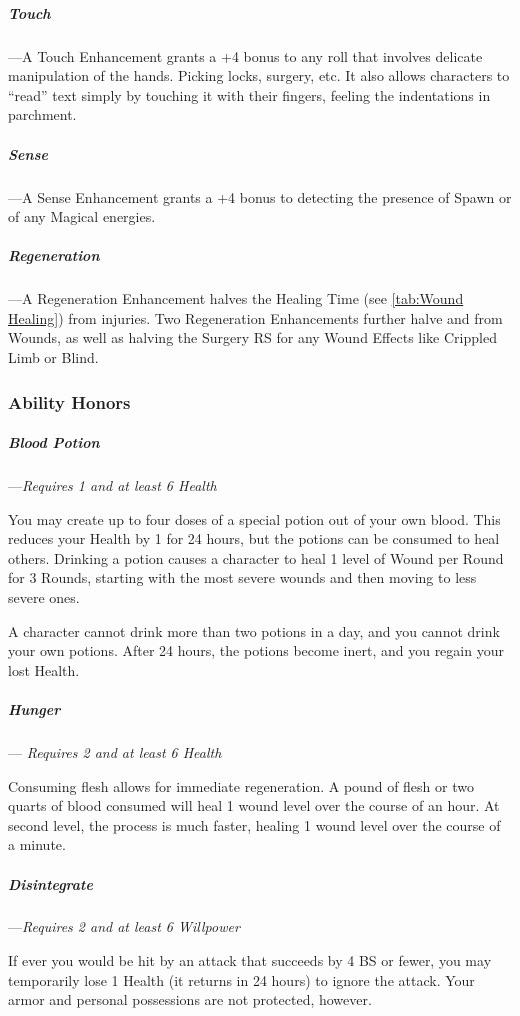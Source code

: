 \documentclass[oneside,11pt,english]{book}
\begin{document}
\subparagraph{Touch}\label{honor:Touch}
---\quad A Touch Enhancement grants a +4 bonus to any roll that involves delicate manipulation 
of the hands. Picking locks, surgery, etc. It also allows characters to “read” text simply by 
touching it with their fingers, feeling the indentations in parchment.

\subparagraph{Sense}\label{honor:Sense}
---\quad A Sense Enhancement grants a +4 bonus to detecting the presence of Spawn or of any 
Magical energies. 

\subparagraph{Regeneration}\label{honor:Regeneration}
---\quad A Regeneration Enhancement halves the Healing Time (see \autoref{tab:Wound Healing}) from injuries. Two 
Regeneration Enhancements further halve  and  from Wounds, as well as 
halving the Surgery RS for any Wound Effects like Crippled Limb or Blind.

\subsubsection{Ability Honors}
\subparagraph{Blood Potion}\label{honor:Blood Potion}
---\quad \emph{Requires  1 and at least 6 Health}

You may create up to four doses
of a special potion out of your own blood. This reduces your Health by 1 for 24 hours, but the 
potions can be consumed to heal others. Drinking a potion causes a character to heal 1 level of 
Wound per Round for 3 Rounds, starting with the most severe wounds and then moving to less 
severe ones. 

A character cannot drink more than two potions in a day, and you cannot drink your own 
potions. After 24 hours, the potions become inert, and you regain your lost Health. 

\subparagraph{Hunger}---\quad\label{honor:Hunger}
\emph{Requires  2 and at least 6 Health}

Consuming flesh allows for immediate regeneration. A pound of flesh or two quarts of blood consumed will heal 1 wound level over the 
course of an hour. At second level, the process is much faster, healing 1 wound level over the 
course of a minute.

\subparagraph{Disintegrate}\label{honor:Disintegrate}
---\quad \emph{Requires  2 and at least 6 Willpower}

If ever you would be hit by an attack that succeeds by 4 BS or fewer, you may temporarily lose 1 Health (it returns in 24 hours) 
to ignore the attack. Your armor and personal possessions are not protected, however. 
\end{document}
